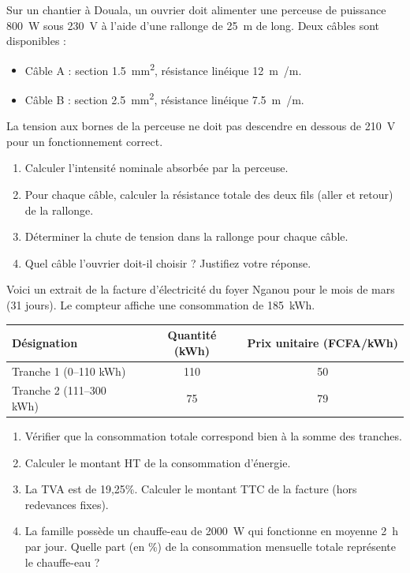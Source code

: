 \documentclass[11pt]{article}
\begin{document}
\begin{exercice}
Sur un chantier à Douala, un ouvrier doit alimenter une perceuse de puissance \SI{800}{W} sous \SI{230}{V} à l'aide d'une rallonge de \SI{25}{m} de long. Deux câbles sont disponibles :
\begin{itemize}
    \item Câble A : section \SI{1,5}{mm^2}, résistance linéique \SI{12}{m\Omega/m}.
    \item Câble B : section \SI{2,5}{mm^2}, résistance linéique \SI{7,5}{m\Omega/m}.
\end{itemize}
La tension aux bornes de la perceuse ne doit pas descendre en dessous de \SI{210}{V} pour un fonctionnement correct.
\begin{enumerate}
    \item Calculer l'intensité nominale absorbée par la perceuse.
    \item Pour chaque câble, calculer la résistance totale des deux fils (aller et retour) de la rallonge.
    \item Déterminer la chute de tension dans la rallonge pour chaque câble.
    \item Quel câble l'ouvrier doit-il choisir ? Justifiez votre réponse.
\end{enumerate}
\end{exercice}

\begin{exercice}
Voici un extrait de la facture d'électricité du foyer Nganou pour le mois de mars (31 jours). Le compteur affiche une consommation de \SI{185}{kWh}.
\begin{center}
\begin{tabular}{|l|c|c|}
\hline
\textbf{Désignation} & \textbf{Quantité (kWh)} & \textbf{Prix unitaire (FCFA/kWh)} \\
\hline
Tranche 1 (0--110 kWh) & 110 & 50 \\
Tranche 2 (111--300 kWh) & 75 & 79 \\
\hline
\end{tabular}
\end{center}
\begin{enumerate}
    \item Vérifier que la consommation totale correspond bien à la somme des tranches.
    \item Calculer le montant HT de la consommation d'énergie.
    \item La TVA est de 19,25\%. Calculer le montant TTC de la facture (hors redevances fixes).
    \item La famille possède un chauffe-eau de \SI{2000}{W} qui fonctionne en moyenne \SI{2}{h} par jour. Quelle part (en \%) de la consommation mensuelle totale représente le chauffe-eau ?
\end{enumerate}
\end{exercice}
\end{document}
